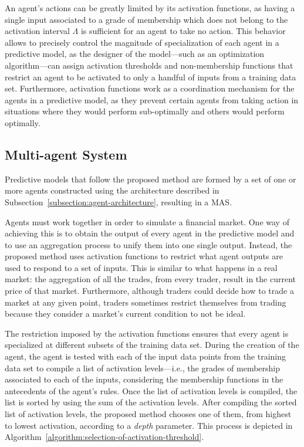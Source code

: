 \documentclass{ieeeaccess}
\begin{document}
An agent's actions can be greatly limited by its activation functions, as having
a single input associated to a grade of membership which does not belong to the
activation interval $\Lambda$ is sufficient for an agent to take no action. This
behavior allows to precisely control the magnitude of specialization of each agent
in a predictive model, as the designer of the model---such as an optimization algorithm---can
assign activation thresholds and non-membership functions
that restrict an agent to be activated to only a handful of inputs from a
training data set. Furthermore, activation functions work as a coordination
mechanism for the agents in a predictive model, as they prevent certain agents
from taking action in situations where they would perform sub-optimally and
others would perform optimally.

\subsection{Multi-agent System}
\label{subsection:mult-agent-system}

Predictive models that follow the proposed method are formed by a set
of one or more agents constructed using the architecture described in
Subsection~\ref{subsection:agent-architecture}, resulting in a MAS.

Agents must work together in order to simulate a financial market. One
way of achieving this is to obtain the output of every agent in the
predictive model and to use an aggregation process to unify them into
one single output. Instead, the proposed method uses activation
functions to restrict what agent outputs are used to respond to a set
of inputs. This is similar to what happens in a real market: the
aggregation of all the trades, from every trader, result in the current
price of that market. Furthermore, although traders could decide how to trade a
market at any given point, traders sometimes restrict themselves from
trading because they consider a market's current condition to not be
ideal.

The restriction imposed by the activation functions ensures that every
agent is specialized at different subsets of the training data
set. During the creation of the agent, the agent is tested with
each of the input data points from the training data set to compile a
list of activation levels---i.e., the grades of membership associated
to each of the inputs, considering the membership functions in the
antecedents of the agent's rules. Once the list of activation levels
is compiled, the list is sorted by using the sum of the activation
levels. After compiling the sorted list of activation levels, the proposed
method chooses one of them, from highest to lowest activation,
according to a \textit{depth} parameter. This process is depicted in
Algorithm~\ref{algorithm:selection-of-activation-threshold}.
\end{document}
